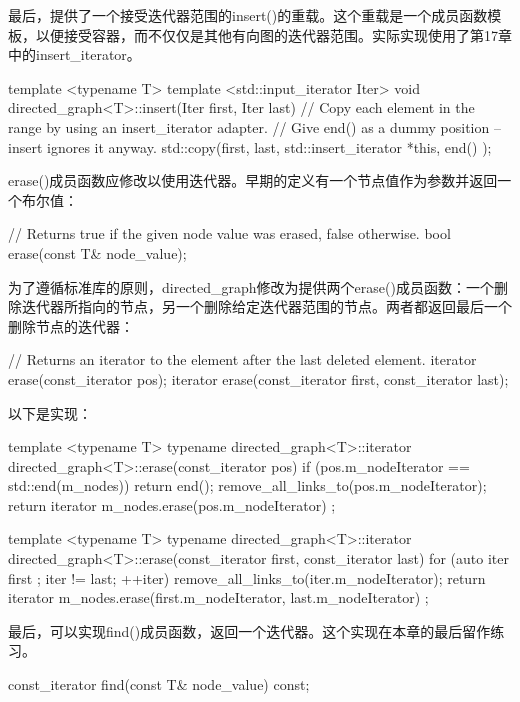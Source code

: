最后，提供了一个接受迭代器范围的insert()的重载。这个重载是一个成员函数模板，以便接受容器，而不仅仅是其他有向图的迭代器范围。实际实现使用了第17章中的insert\_iterator。

\begin{cpp}
template <typename T>
template <std::input_iterator Iter>
void directed_graph<T>::insert(Iter first, Iter last)
{
    // Copy each element in the range by using an insert_iterator adapter.
    // Give end() as a dummy position -- insert ignores it anyway.
    std::copy(first, last, std::insert_iterator { *this, end() });
}
\end{cpp}

erase()成员函数应修改以使用迭代器。早期的定义有一个节点值作为参数并返回一个布尔值：

\begin{cpp}
// Returns true if the given node value was erased, false otherwise.
bool erase(const T& node_value);
\end{cpp}

为了遵循标准库的原则，directed\_graph修改为提供两个erase()成员函数：一个删除迭代器所指向的节点，另一个删除给定迭代器范围的节点。两者都返回最后一个删除节点的迭代器：

\begin{cpp}
// Returns an iterator to the element after the last deleted element.
iterator erase(const_iterator pos);
iterator erase(const_iterator first, const_iterator last);
\end{cpp}

以下是实现：

\begin{cpp}
template <typename T>
typename directed_graph<T>::iterator
    directed_graph<T>::erase(const_iterator pos)
{
    if (pos.m_nodeIterator == std::end(m_nodes)) {
        return end();
    }
    remove_all_links_to(pos.m_nodeIterator);
    return iterator { m_nodes.erase(pos.m_nodeIterator) };
}

template <typename T>
typename directed_graph<T>::iterator
    directed_graph<T>::erase(const_iterator first, const_iterator last)
{
    for (auto iter { first }; iter != last; ++iter) {
        remove_all_links_to(iter.m_nodeIterator);
    }
    return iterator { m_nodes.erase(first.m_nodeIterator, last.m_nodeIterator) };
}
\end{cpp}

最后，可以实现find()成员函数，返回一个迭代器。这个实现在本章的最后留作练习。

\begin{cpp}
const_iterator find(const T& node_value) const;
\end{cpp}

